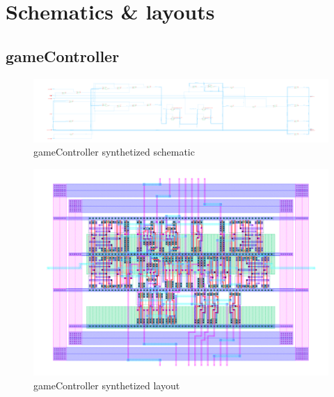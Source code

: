 \documentclass[]{article}
\begin{document}








\section{Schematics \& layouts}

\subsection{gameController}
\begin{figure}[H]
\centering
\includegraphics[width=.9\textwidth]{gameController-schematic}
\caption{gameController synthetized schematic}
\label{fig:gameController-schematic}
\end{figure}

\begin{figure}[H]
\centering
\includegraphics[width=.9\textwidth]{gameController-layout}
\caption{gameController synthetized layout}
\label{fig:gameController-layout}
\end{figure}

\end{document}
